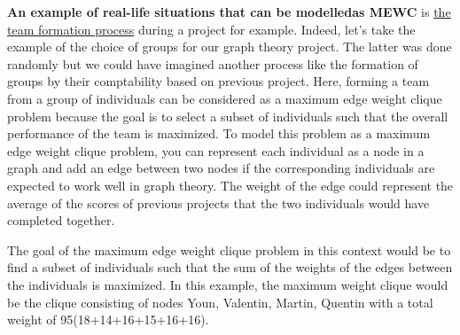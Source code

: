 \documentclass{article}
\begin{document}
\begin{flushleft}

    \textbf{An example of real-life situations that can be modelledas MEWC} is \underline{the team formation process} during a project for example. 
    \newline \newline
    Indeed, let's take the example of the choice of groups for our graph theory project. The latter was done randomly but we could have imagined another process like the formation of groups by their comptability based on previous project. Here, forming a team from a group of individuals can be considered as a maximum edge weight clique problem because the goal is to select a subset of individuals such that the overall performance of the team is maximized.
    \newline \newline
    To model this problem as a maximum edge weight clique problem, you can represent each individual as a node in a graph and add an edge between two nodes if the corresponding individuals are expected to work well in graph theory. The weight of the edge could represent the average of the scores of previous projects that the two individuals would have completed together.

    \begin{center}
    \end{center}
    
    The goal of the maximum edge weight clique problem in this context would be to find a subset of individuals such that the sum of the weights of the edges between the individuals is maximized. In this example, the maximum weight clique would be the clique consisting of nodes Youn, Valentin, Martin, Quentin with a total weight of 95(18+14+16+15+16+16).

\end{flushleft}
\end{document}
